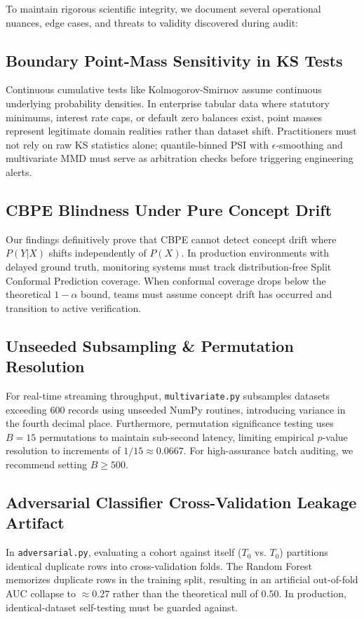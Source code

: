 \documentclass[conference]{IEEEtran}
\begin{document}
To maintain rigorous scientific integrity, we document several operational nuances, edge cases, and threats to validity discovered during audit:

\subsection{Boundary Point-Mass Sensitivity in KS Tests}
Continuous cumulative tests like Kolmogorov-Smirnov assume continuous underlying probability densities. In enterprise tabular data where statutory minimums, interest rate caps, or default zero balances exist, point masses represent legitimate domain realities rather than dataset shift. Practitioners must not rely on raw KS statistics alone; quantile-binned PSI with $\epsilon$-smoothing and multivariate MMD must serve as arbitration checks before triggering engineering alerts.

\subsection{CBPE Blindness Under Pure Concept Drift}
Our findings definitively prove that CBPE cannot detect concept drift where $P(Y|X)$ shifts independently of $P(X)$. In production environments with delayed ground truth, monitoring systems must track distribution-free Split Conformal Prediction coverage. When conformal coverage drops below the theoretical $1-\alpha$ bound, teams must assume concept drift has occurred and transition to active verification.

\subsection{Unseeded Subsampling \& Permutation Resolution}
For real-time streaming throughput, \texttt{multivariate.py} subsamples datasets exceeding 600 records using unseeded NumPy routines, introducing variance in the fourth decimal place. Furthermore, permutation significance testing uses $B=15$ permutations to maintain sub-second latency, limiting empirical $p$-value resolution to increments of $1/15 \approx 0.0667$. For high-assurance batch auditing, we recommend setting $B \ge 500$.

\subsection{Adversarial Classifier Cross-Validation Leakage Artifact}
In \texttt{adversarial.py}, evaluating a cohort against itself ($T_0$ vs. $T_0$) partitions identical duplicate rows into cross-validation folds. The Random Forest memorizes duplicate rows in the training split, resulting in an artificial out-of-fold AUC collapse to $\approx 0.27$ rather than the theoretical null of $0.50$. In production, identical-dataset self-testing must be guarded against.
\end{document}
